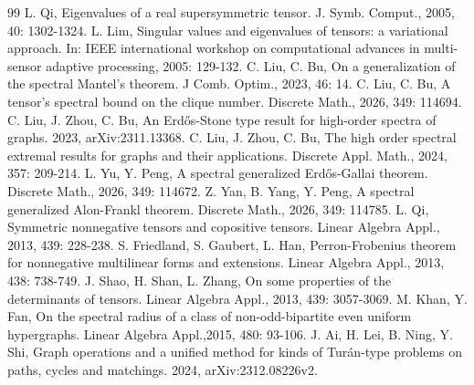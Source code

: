 \documentclass[preprint,12pt]{elsarticle}
\begin{document}
\begin{thebibliography}{99}
 L. Qi, Eigenvalues of a real supersymmetric tensor. J. Symb. Comput., 2005, 40: 1302-1324.
 L. Lim, Singular values and eigenvalues of tensors: a variational approach. In: IEEE international workshop on computational advances in multi-sensor adaptive processing, 2005: 129-132.
 C. Liu, C. Bu, On a generalization of the spectral Mantel's theorem. J Comb. Optim., 2023, 46: 14.
 C. Liu, C. Bu, A tensor's spectral bound on the clique number. Discrete Math., 2026, 349: 114694.
 C. Liu, J. Zhou, C. Bu, An Erd\H{o}s-Stone type result for high-order spectra of graphs. 2023, arXiv:2311.13368.
 C. Liu, J. Zhou, C. Bu, The high order spectral extremal results for graphs and their applications. Discrete Appl. Math., 2024, 357: 209-214.
 L. Yu, Y. Peng, A spectral generalized Erd\H{o}s-Gallai theorem. Discrete Math., 2026, 349: 114672.
 Z. Yan, B. Yang, Y. Peng, A spectral generalized Alon-Frankl theorem. Discrete Math., 2026, 349: 114785.
 L. Qi, Symmetric nonnegative tensors and copositive tensors. Linear Algebra Appl., 2013, 439: 228-238.
	S. Friedland, S. Gaubert, L. Han, Perron-Frobenius theorem for nonnegative multilinear forms and extensions. Linear Algebra Appl., 2013, 438: 738-749.
 J. Shao, H. Shan, L. Zhang, On some properties of the determinants of tensors. Linear Algebra Appl., 2013, 439: 3057-3069.
 M. Khan, Y. Fan, On the spectral radius of a class of non-odd-bipartite even uniform hypergraphs. Linear Algebra Appl.,2015, 480: 93-106.
 J. Ai, H. Lei, B. Ning, Y. Shi, Graph operations and a unified method for kinds of Tur\'{a}n-type problems on paths, cycles and matchings. 2024, arXiv:2312.08226v2.

\end{thebibliography}
\end{document}
